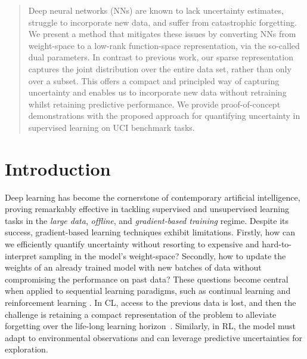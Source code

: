 \documentclass{article}
\begin{document}
\begin{abstract}
Deep neural networks (NNs) are known to lack uncertainty estimates, struggle to incorporate new data, and suffer from catastrophic forgetting. We present a method that mitigates these issues by converting NNs from weight-space to a low-rank function-space representation, via the so-called dual parameters. In contrast to previous work, our sparse representation captures the joint distribution over the entire data set, rather than only over a subset. This offers a compact and principled way of capturing uncertainty and enables us to incorporate new data without retraining whilst retaining predictive performance. We provide proof-of-concept demonstrations with the proposed approach for quantifying uncertainty in supervised learning on UCI benchmark tasks.
\end{abstract}

\section{Introduction}
%
Deep learning \citep{goodfellow2016deep} has become the cornerstone of contemporary artificial intelligence, proving remarkably effective in tackling supervised and unsupervised learning tasks in the {\em large data}, {\em offline}, and {\em gradient-based training} regime. Despite its success, gradient-based learning techniques exhibit limitations. Firstly, how can we efficiently quantify uncertainty without resorting to expensive and hard-to-interpret sampling in the model's weight-space? Secondly, how to update the weights of an already trained model with new batches of data without compromising the performance on past data? These questions become central when applied to sequential learning paradigms, such as continual learning \citep[CL,][]{parisi2019continual, de2021continual} and reinforcement learning  \citep[RL,][]{sutton2018reinforcement}. In CL, access to the previous data is lost, and then the challenge is retaining a compact representation of the problem to alleviate forgetting over the life-long learning horizon~\citep{mccloskey1989catastrophic}.
Similarly, in RL, the model must adapt to environmental observations and can leverage predictive uncertainties for exploration.
\end{document}

